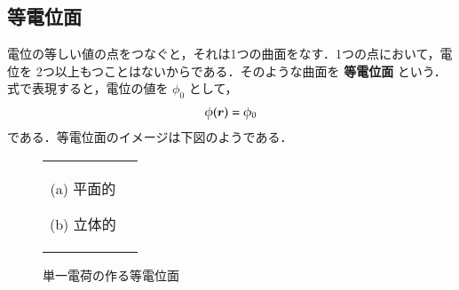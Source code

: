        \subsection{等電位面}
            電位の等しい値の点をつなぐと，それは1つの曲面をなす．1つの点において，電位を
            2つ以上もつことはないからである．そのような曲面を \textbf{等電位面} という．
            式で表現すると，電位の値を $\phi_{0}$ として，
                \begin{align}
                    \phi(\boldsymbol{r})=\phi_{0}
                \end{align}
            である．等電位面のイメージは下図のようである．
                \begin{figure}[hbt]
                    \begin{tabular}{cc}
                        \begin{minipage}{0.5\hsize}
                                \begin{center}
                                    {toudenimen_monopole.pdf}
                                    \label{fig:toudenimen0}

                                    (a) 平面的

                                \end{center}
                        \end{minipage}
                        \begin{minipage}{0.5\hsize}
                                \begin{center}
                                    {Potentiol_monopole.pdf}
                                    \label{fig:toudenimen1}

                                    (b) 立体的
                                \end{center}
                        \end{minipage}
                    \end{tabular}
                    \caption{単一電荷の作る等電位面}
                \end{figure}

